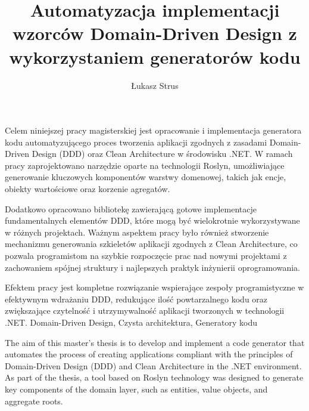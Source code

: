 \documentclass[
    left=2.5cm,         %
    right=2.5cm,        %
    top=2.5cm,          %
    bottom=3cm,         %
    bindingoffset=6mm,  %
    nohyphenation=false %
]{eiti/eiti-thesis}
\begin{document}
\MasterThesis %
{}
\title{
    Automatyzacja implementacji wzorców Domain-Driven Design z wykorzystaniem generatorów kodu
}
\author{Łukasz Strus}
\date{\the\year}
\maketitle

\cleardoublepage %
\streszczenie Celem niniejszej pracy magisterskiej jest opracowanie i implementacja generatora kodu automatyzującego proces tworzenia aplikacji zgodnych z zasadami Domain-Driven Design (DDD) oraz Clean Architecture w środowisku .NET. W ramach pracy zaprojektowano narzędzie oparte na technologii Roslyn, umożliwiające generowanie kluczowych komponentów warstwy domenowej, takich jak encje, obiekty wartościowe oraz korzenie agregatów.

Dodatkowo opracowano bibliotekę zawierającą gotowe implementacje fundamentalnych elementów DDD, które mogą być wielokrotnie wykorzystywane w różnych projektach. Ważnym aspektem pracy było również stworzenie mechanizmu generowania szkieletów aplikacji zgodnych z Clean Architecture, co pozwala programistom na szybkie rozpoczęcie prac nad nowymi projektami z zachowaniem spójnej struktury i najlepszych praktyk inżynierii oprogramowania.

Efektem pracy jest kompletne rozwiązanie wspierające zespoły programistyczne w efektywnym wdrażaniu DDD, redukujące ilość powtarzalnego kodu oraz zwiększające czytelność i utrzymywalność aplikacji tworzonych w technologii .NET.
\slowakluczowe Domain-Driven Design, Czysta architektura, Generatory kodu

\newpage
\abstract The aim of this master's thesis is to develop and implement a code generator that automates the process of creating applications compliant with the principles of Domain-Driven Design (DDD) and Clean Architecture in the .NET environment. As part of the thesis, a tool based on Roslyn technology was designed to generate key components of the domain layer, such as entities, value objects, and aggregate roots.
\end{document}
